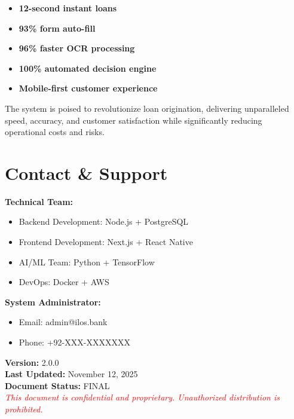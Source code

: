 \documentclass[12pt,a4paper]{article}
\begin{document}
\begin{itemize}
    \item \textbf{12-second instant loans}
    \item \textbf{93\% form auto-fill}
    \item \textbf{96\% faster OCR processing}
    \item \textbf{100\% automated decision engine}
    \item \textbf{Mobile-first customer experience}
\end{itemize}

The system is poised to revolutionize loan origination, delivering unparalleled speed, accuracy, and customer satisfaction while significantly reducing operational costs and risks.

\vspace{2cm}

\section*{Contact \& Support}

\textbf{Technical Team:}
\begin{itemize}[noitemsep]
    \item Backend Development: Node.js + PostgreSQL
    \item Frontend Development: Next.js + React Native
    \item AI/ML Team: Python + TensorFlow
    \item DevOps: Docker + AWS
\end{itemize}

\vspace{1cm}

\textbf{System Administrator:}
\begin{itemize}[noitemsep]
    \item Email: admin@ilos.bank
    \item Phone: +92-XXX-XXXXXXX
\end{itemize}

\vspace{1cm}

\begin{center}
\textbf{Version:} 2.0.0 \\
\textbf{Last Updated:} November 12, 2025 \\
\textbf{Document Status:} FINAL \\
\vspace{0.5cm}
\textcolor{red}{\textit{This document is confidential and proprietary. Unauthorized distribution is prohibited.}}
\end{center}
\end{document}
